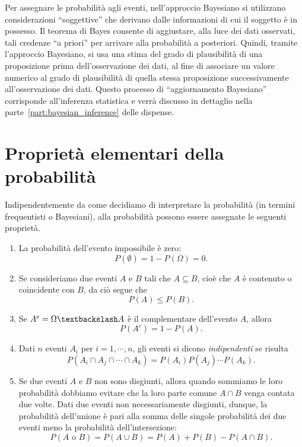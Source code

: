Per assegnare le probabilità agli eventi, nell'approccio Bayesiano si utilizzano considerazioni \enquote{soggettive} che derivano dalle informazioni di cui il soggetto è in possesso.
Il teorema di Bayes consente di aggiustare, alla luce dei dati osservati, tali  credenze \enquote{a priori} per arrivare alla probabilità a posteriori.  
Quindi, tramite l'approccio Bayesiano, si usa una stima del grado di plausibilità di una proposizione prima dell'osservazione dei dati, al fine di associare un valore numerico al grado di plausibilità di quella stessa proposizione successivamente all'osservazione dei dati.
Questo processo di \enquote{aggiornamento Bayesiano} corrisponde all'inferenza statistica e verrà discusso in dettaglio nella parte~\ref{part:bayesian_inference} delle dispense.


\section{Proprietà elementari della probabilità}

Indipendentemente da come decidiamo di interpretare la probabilità (in termini frequentisti o Bayesiani), alla probabilità possono essere assegnate le seguenti proprietà.
\begin{enumerate}[label=(\alph*)]
\item La probabilità dell'evento impossibile è zero:
\begin{equation}
P(\emptyset) = 1 - P(\Omega) = 0.
\end{equation}
\item Se consideriamo due eventi $A$ e $B$ tali che $A \subseteq B$, cioè che $A$ è contenuto o coincidente con $B$, da ciò segue che 
\begin{equation}
 P(A) \leq P(B). 
\end{equation}
\item Se $A^c = \Omega \textbackslash A$ è il complementare dell'evento $A$, allora 
\begin{equation}
P(A^c) = 1 - P(A).
\label{eqprobcomp}
\end{equation}
\item Dati $n$ eventi $A_i$ per $i= 1, \cdots, n$, gli eventi si dicono \emph{indipendenti} se risulta
\begin{equation}
P(A_i \cap A_j \cap \cdots \cap A_k) = P(A_i) P(A_j) \cdots P(A_k).
\label{eq_indipendence}
\end{equation}
\item Se due eventi $A$ e $B$ non sono disgiunti, allora  quando sommiamo le loro probabilità dobbiamo evitare che la loro parte comune $A \cap B$ venga contata due volte. 
Dati due eventi non necessariamente disgiunti, dunque, la probabilità dell'unione è pari alla somma delle singole probabilità dei due eventi meno la probabilità dell'intersezione:
\begin{equation}
P(A \text{ o } B) = P(A \cup B) = P(A) + P(B) - P(A \cap B).
\label{eq:probunione}
\end{equation}
\end{enumerate}

